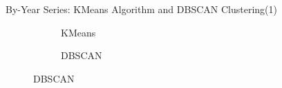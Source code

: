 \documentclass[12pt]{beamer}
\begin{document}
        \begin{frame}{By-Year Series: KMeans Algorithm and DBSCAN Clustering(1)}
            \begin{figure}
                \centering
                \begin{subfigure}{0.20\textwidth}
                    \caption{KMeans}
                \end{subfigure}
                \begin{subfigure}{0.20\textwidth}
                    \caption{DBSCAN}
                \end{subfigure}
            \end{figure}
        \end{frame}
\end{document}
